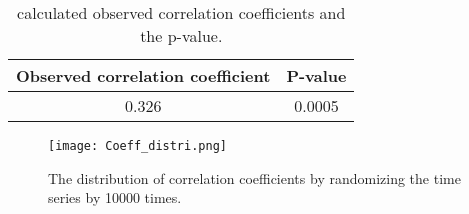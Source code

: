 \documentclass[12pt]{article}
\begin{document}
  \begin{table}[hb]
      \centering
      \begin{tabular}{||c c||}
      \hline
      Observed correlation coefficient & P-value \\ [0.5ex]
      \hline\hline
      0.326 & 0.0005 \\ [1ex]
      \hline
      \end{tabular}
      \caption{calculated observed correlation coefficients and the p-value.}
  \end{table}
  


  \begin{figure}[hb]
    \centering
    \texttt{[image: Coeff\_distri.png]}
    \caption{The distribution of correlation coefficients by randomizing the time series by 10000 times.}
    \label{Overallfig}
  \end{figure}
  
  
  
  
\end{document}
